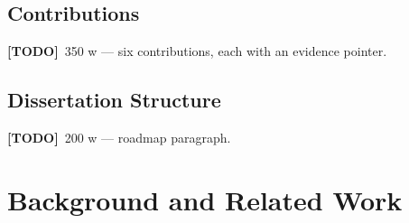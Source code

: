 \documentclass[11pt,a4paper]{report}
\newcommand{\todo}[1]{\par\noindent\textcolor{red!70!black}{\small\textbf{[TODO]}~#1}\par}
\begin{document}
\section{Contributions}
\label{sec:intro-contributions}
\todo{350 w — six contributions, each with an evidence pointer.}

\section{Dissertation Structure}
\label{sec:intro-structure}
\todo{200 w — roadmap paragraph.}

\chapter{Background and Related Work}
\label{ch:background}
\end{document}
